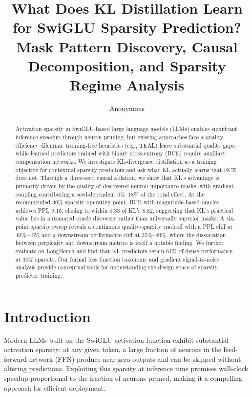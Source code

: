 \documentclass[11pt,a4paper]{article}
\title{What Does KL Distillation Learn for SwiGLU Sparsity Prediction?\\
Mask Pattern Discovery, Causal Decomposition, and Sparsity Regime Analysis}
\author{Anonymous}
\date{}
\begin{document}
\maketitle

\begin{abstract}
Activation sparsity in SwiGLU-based large language models (LLMs) enables significant inference speedup through neuron pruning, but existing approaches face a quality-efficiency dilemma: training-free heuristics (e.g., TEAL) leave substantial quality gaps, while learned predictors trained with binary cross-entropy (BCE) require auxiliary compensation networks. We investigate KL-divergence distillation as a training objective for contextual sparsity predictors and ask what KL actually learns that BCE does not. Through a three-seed causal ablation, we show that KL's advantage is primarily driven by the quality of discovered neuron importance masks, with gradient coupling contributing a seed-dependent 0\%--18\% of the total effect. At the recommended 30\% sparsity operating point, BCE with magnitude-based oracles achieves PPL 9.15, closing to within 0.33 of KL's 8.82, suggesting that KL's practical value lies in automated oracle discovery rather than universally superior masks. A six-point sparsity sweep reveals a continuous quality-sparsity tradeoff with a PPL cliff at 40\%--45\% and a downstream performance cliff at 35\%--40\%, where the dissociation between perplexity and downstream metrics is itself a notable finding. We further evaluate on LongBench and find that KL predictors retain 61\% of dense performance at 30\% sparsity. Our formal loss function taxonomy and gradient signal-to-noise analysis provide conceptual tools for understanding the design space of sparsity predictor training.
\end{abstract}

\section{Introduction}
\label{sec:intro}

Modern LLMs built on the SwiGLU activation function exhibit substantial activation sparsity: at any given token, a large fraction of neurons in the feed-forward network (FFN) produce near-zero outputs and can be skipped without altering predictions. Exploiting this sparsity at inference time promises wall-clock speedup proportional to the fraction of neurons pruned, making it a compelling approach for efficient deployment.
\end{document}

